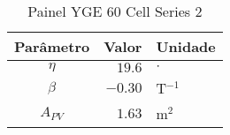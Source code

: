 
\begin{table}[ht]
	\centering
	\caption{Painel YGE 60 Cell Series 2}\label{tbl:painel}
    \begin{tabular}{c r l}
		\hline
        Parâmetro    &   Valor & Unidade\\
		\hline
		\hline
        $\eta$       &  $19.6$ & $\cdot$  \\
        $\beta$      & $-0.30$ & T$^{-1}$ \\
        $A_{PV}$     &  $1.63$ & m$^2$    \\
		\hline
	\end{tabular}
\end{table}
